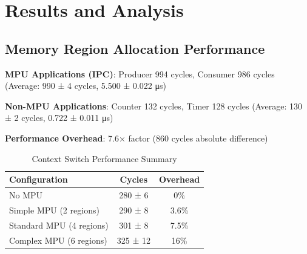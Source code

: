 \chapter{Results and Analysis}
\label{sec:results}

\section{Memory Region Allocation Performance}

\textbf{MPU Applications (IPC)}: Producer 994 cycles, Consumer 986 cycles (Average: 990 ± 4 cycles, 5.500 ± 0.022 μs)

\textbf{Non-MPU Applications}: Counter 132 cycles, Timer 128 cycles (Average: 130 ± 2 cycles, 0.722 ± 0.011 μs)

\textbf{Performance Overhead}: 7.6× factor (860 cycles absolute difference)

\begin{table}[h]
\centering
\caption{Context Switch Performance Summary}
\begin{tabular}{@{}lcc@{}}
\toprule
Configuration & Cycles & Overhead \\
\midrule
No MPU & 280 ± 6 & 0\% \\
Simple MPU (2 regions) & 290 ± 8 & 3.6\% \\
Standard MPU (4 regions) & 301 ± 8 & 7.5\% \\
Complex MPU (6 regions) & 325 ± 12 & 16\% \\
\bottomrule
\end{tabular}
\end{table}

